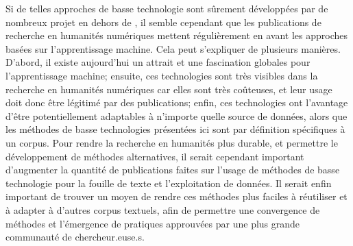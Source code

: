 Si de telles approches de basse technologie sont sûrement développées par de nombreux projet en dehors de \mssktb{}, il semble cependant que les publications de recherche en humanités numériques mettent régulièrement en avant les approches basées sur l'apprentissage machine. Cela peut s'expliquer de plusieurs manières. D'abord, il existe aujourd'hui un attrait et une fascination globales pour l'apprentissage machine; ensuite, ces technologies sont très visibles dans la recherche en humanités numériques car elles sont très coûteuses, et leur usage doit donc être légitimé par des publications; enfin, ces technologies ont l'avantage d'être potentiellement adaptables à n'importe quelle source de données, alors que les méthodes de basse technologies présentées ici sont par définition spécifiques à un corpus. Pour rendre la recherche en humanités plus durable, et permettre le développement de méthodes alternatives, il serait cependant important d'augmenter la quantité de publications faites sur l'usage de méthodes de basse technologie pour la fouille de texte et l'exploitation de données. Il serait enfin important de trouver un moyen de rendre ces méthodes plus faciles à réutiliser et à adapter à d'autres corpus textuels, afin de permettre une convergence de méthodes et l'émergence de pratiques approuvées par une plus grande communauté de chercheur.euse.s.
